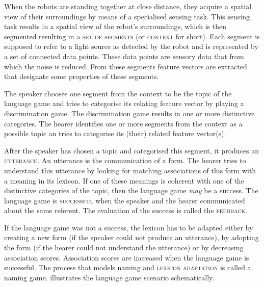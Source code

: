 \newpage
When the robots are standing together at close distance, they acquire a spatial view of their surroundings by means of a specialised sensing task. This sensing task results in a spatial view of the robot's surroundings, which is then segmented resulting in a {\scshape set of segments} (or {\scshape context} for short). Each segment is supposed to refer to a light source as detected by the robot and is represented by a set of connected data points. These data points are sensory data that from which the noise is reduced. From these segments feature vectors are extracted that designate some properties of these segments. 

The speaker chooses one segment from the context to be the topic of the language game and tries to categorise its relating feature vector by playing a discrimination game. The discrimination game results in one or more distinctive categories. The hearer identifies one or more segments from the context as a possible topic an tries to categorise its (their) related feature vector(s).

After the speaker has chosen a topic and categorised this segment, it produces an {\scshape utterance}. An utterance is the communication of a form. The hearer tries to understand this utterance by looking for matching associations of this form with a meaning in its lexicon. If one of these meanings is coherent with one of the distinctive categories of the topic, then the language game {\it may} be a success. The language game is {\scshape successful} when the speaker and the hearer communicated about the same referent. The evaluation of the success is called the {\scshape feedback}.

If the language game was not a success, the lexicon has to be adapted either by creating a new form (if the speaker could not produce an utterance), by adopting the form (if the hearer could not understand the utterance) or by decreasing association scores. Association scores are increased when the language game is successful. The process that models naming and {\scshape lexicon adaptation} is called a naming game.  illustrates the language game scenario schematically.

